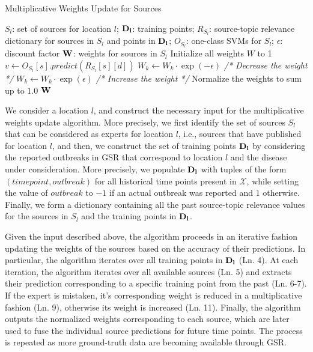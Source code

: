 \documentclass[conference]{IEEEtran}
\begin{document}
\begin{algorithm}[h]
\caption{Multiplicative Weights Update for Sources}
\begin{algorithmic}[1]
 $S_l$: set of sources for location $l$; ${\bf D_l}$: training points; $R_{S_l}$: source-topic relevance dictionary for sources in $S_l$ and points in ${\bf D_l}$; $O_{S_l}$: one-class SVMs for $S_l$; $\epsilon$: discount factor
 $\bf{W}$: weights for sources in $S_l$
\STATE Initialize all weights $W$ to 1
	\STATE $v \leftarrow O_{S_l}[s].predict(R_{S_l}[s][d])$
		\STATE  $W_k \leftarrow W_k\cdot \exp(-\epsilon)$ {\em /* Decrease the weight */}
	\ELSE
		\STATE $W_k \leftarrow W_k\cdot \exp(\epsilon)$ {\em /* Increase the weight */}
	\ENDIF
	\ENDFOR	
	\STATE Normalize the weights to sum up to $1.0$
\ENDFOR
\RETURN ${\bf W}$
\end{algorithmic}
\label{algo:mw}
\end{algorithm}

We consider a location $l$, and construct the necessary input for the multiplicative weights update algorithm. More precisely, we first identify the set of sources $S_l$ that can be considered as experts for location $l$, i.e., sources that have published for location $l$, and then, we construct the set of training points  ${\bf D_l}$ by considering the reported outbreaks in GSR that correspond to location $l$ and the disease under consideration. More precisely, we populate ${\bf D_l}$ with tuples of the form $(time point, outbreak)$ for all historical time points present in $\mathcal{X}$, while setting the value of $outbreak$ to $-1$ if an actual outbreak was reported and $1$ otherwise. Finally, we form a dictionary containing all the past source-topic relevance values for the sources in $S_l$ and the training points in ${\bf D_l}$.

Given the input described above, the algorithm proceeds in an iterative fashion updating the weights of the sources based on the accuracy of their predictions. In particular, the algorithm iterates over all training points in ${\bf D_l}$ (Ln. 4).  At each iteration, the algorithm iterates over all available sources (Ln. 5) and extracts their prediction corresponding to a specific training point from the past (Ln. 6-7). If the expert is mistaken, it's corresponding weight is reduced in a multiplicative fashion (Ln. 9), otherwise its weight is increased (Ln. 11). Finally, the algorithm outputs the normalized weights corresponding to each source, which are later used to fuse the individual source predictions for future time points. The process is repeated as more ground-truth data are becoming available through GSR.
\end{document}
